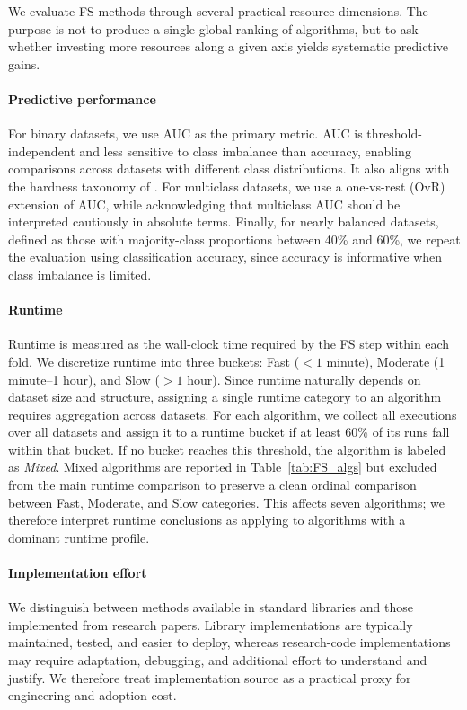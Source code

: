 \documentclass[preprint,12pt,authoryear]{elsarticle}
\begin{document}
{We evaluate FS methods through several practical resource dimensions. The purpose is not to produce a single global ranking of algorithms, but to ask whether investing more resources along a given axis yields systematic predictive gains.

\paragraph{Predictive performance}
For binary datasets, we use AUC as the primary metric. AUC is threshold-independent and less sensitive to class imbalance than accuracy, enabling comparisons across datasets with different class distributions. It also aligns with the hardness taxonomy of \cite{elmakias2025choosing}. For multiclass datasets, we use a one-vs-rest (OvR) extension of AUC, while acknowledging that multiclass AUC should be interpreted cautiously in absolute terms. Finally, for nearly balanced datasets, defined as those with majority-class proportions between 40\% and 60\%, we repeat the evaluation using classification accuracy, since accuracy is informative when class imbalance is limited.

\paragraph{Runtime}
Runtime is measured as the wall-clock time required by the FS step within each fold. We discretize runtime into three buckets: Fast ($<1$ minute), Moderate (1 minute--1 hour), and Slow ($>1$ hour). Since runtime naturally depends on dataset size and structure, assigning a single runtime category to an algorithm requires aggregation across datasets. For each algorithm, we collect all executions over all datasets and assign it to a runtime bucket if at least 60\% of its runs fall within that bucket. If no bucket reaches this threshold, the algorithm is labeled as \emph{Mixed}. Mixed algorithms are reported in Table~\ref{tab:FS_algs} but excluded from the main runtime comparison to preserve a clean ordinal comparison between Fast, Moderate, and Slow categories. This affects seven algorithms; we therefore interpret runtime conclusions as applying to algorithms with a dominant runtime profile.

\paragraph{Implementation effort}
We distinguish between methods available in standard libraries and those implemented from research papers. Library implementations are typically maintained, tested, and easier to deploy, whereas research-code implementations may require adaptation, debugging, and additional effort to understand and justify. We therefore treat implementation source as a practical proxy for engineering and adoption cost.

}
\end{document}
